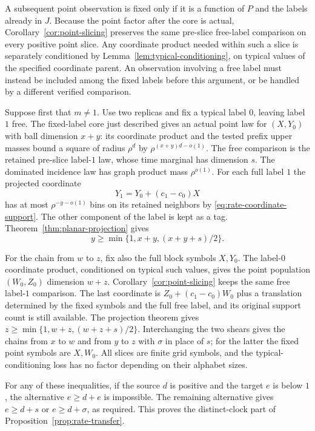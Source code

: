 A subsequent point observation is fixed only if it is a function
of $P$ and the labels already in $J$.  Because the point factor
after the core is actual, Corollary~\ref{cor:point-slicing}
preserves the same pre-slice free-label comparison on every
positive point slice.  Any coordinate product needed within such
a slice is separately conditioned by
Lemma~\ref{lem:typical-conditioning}, on typical values of the
specified coordinate parent.  An observation involving a free
label must instead be included among the fixed labels before this
argument, or be handled by a different verified comparison.

Suppose first that $m\ne1$.  Use two replicas and fix a typical
label $0$, leaving label $1$ free.  The fixed-label core just
described gives an actual point law for $(X,Y_0)$ with ball
dimension $x+y$: its coordinate product and the tested prefix
upper masses bound a square of radius $\rho^d$ by
$\rho^{(x+y)d-o(1)}$.  The free comparison is the retained
pre-slice label-$1$ law, whose time marginal has dimension $s$.
The dominated incidence law has graph product mass
$\rho^{o(1)}$.  For each full label $1$ the projected coordinate
\[
 Y_1=Y_0+(c_1-c_0)X
\]
has at most $\rho^{-y-o(1)}$ bins on its retained neighbors by
\eqref{eq:rate-coordinate-support}.  The other component of the
label is kept as a tag.  Theorem~\ref{thm:planar-projection} gives
\begin{equation}
 y\ge\min\{1,x+y,(x+y+s)/2\}.
 \label{eq:rate-first-chain}
\end{equation}

For the chain from $w$ to $z$, fix also the full block symbols
$X,Y_0$.  The label-$0$ coordinate product, conditioned on
typical such values, gives the point population $(W_0,Z_0)$
dimension $w+z$.  Corollary~\ref{cor:point-slicing} keeps the
same free label-$1$ comparison.  The last coordinate is
$Z_0+(c_1-c_0)W_0$ plus a translation determined by the fixed
symbols and the full free label, and its original support count
is still available.  The projection theorem gives
$z\ge\min\{1,w+z,(w+z+s)/2\}$.
Interchanging the two shears gives the chains from $x$ to $w$
and from $y$ to $z$ with $\sigma$ in place of $s$; for the latter
the fixed point symbols are $X,W_0$.  All slices are finite
grid symbols, and the typical-conditioning loss has no factor
depending on their alphabet sizes.

For any of these inequalities, if the source $d$ is positive and
the target $e$ is below $1$, the alternative $e\ge d+e$ is
impossible.  The remaining alternative gives $e\ge d+s$ or
$e\ge d+\sigma$, as required.  This proves the distinct-clock
part of Proposition~\ref{prop:rate-transfer}.

